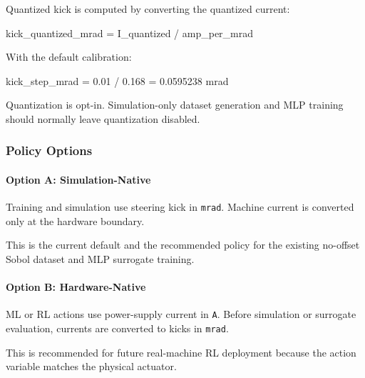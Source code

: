 \documentclass[
]{article}
\newenvironment{Shaded}{}{}
\newcommand{\NormalTok}[1]{#1}
\begin{document}
Quantized kick is computed by converting the quantized current:

\begin{Shaded}
\begin{Highlighting}[]
\NormalTok{kick\_quantized\_mrad = I\_quantized / amp\_per\_mrad}
\end{Highlighting}
\end{Shaded}

With the default calibration:

\begin{Shaded}
\begin{Highlighting}[]
\NormalTok{kick\_step\_mrad = 0.01 / 0.168 = 0.0595238 mrad}
\end{Highlighting}
\end{Shaded}

Quantization is opt-in. Simulation-only dataset generation and MLP
training should normally leave quantization disabled.

\hypertarget{policy-options}{%
\subsubsection{Policy Options}\label{policy-options}}

\hypertarget{option-a-simulation-native}{%
\paragraph{Option A:
Simulation-Native}\label{option-a-simulation-native}}

Training and simulation use steering kick in \texttt{mrad}. Machine
current is converted only at the hardware boundary.

This is the current default and the recommended policy for the existing
no-offset Sobol dataset and MLP surrogate training.

\hypertarget{option-b-hardware-native}{%
\paragraph{Option B: Hardware-Native}\label{option-b-hardware-native}}

ML or RL actions use power-supply current in \texttt{A}. Before
simulation or surrogate evaluation, currents are converted to kicks in
\texttt{mrad}.

This is recommended for future real-machine RL deployment because the
action variable matches the physical actuator.
\end{document}
